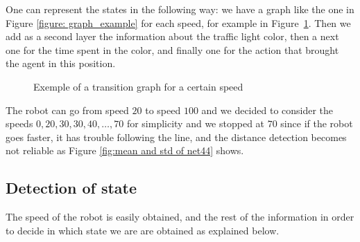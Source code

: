 \documentclass[14pt,a4paper]{article}
\theoremstyle{definition}
\begin{document}
One can represent the states in the following way: we have a graph like the one in Figure  \ref{figure: graph_example} for each speed, for example in Figure~\ref{figure: graph_ex}. Then we add as a second layer the information about the traffic light color, then a next one for the time spent in the color, and finally one for the action that brought the agent in this position.
\begin{figure}[H]
\begin{center}
\end{center}
    \caption{Exemple of a transition graph for a certain speed}
    \label{figure: graph_ex}

\end{figure}


The robot can go from speed $20$ to speed $100$  and we decided to consider the speeds $0,20,30,30,40,\ldots, 70$ for simplicity and we stopped at $70$ since if the robot goes faster, it has trouble following the line, and the distance detection becomes not reliable as Figure \ref{fig:mean and std of net44} shows.

\subsection{Detection of state} \label{detection}

The speed of the robot is easily obtained, and the rest of the information in order to decide in which state we are are obtained as explained below.
\end{document}
